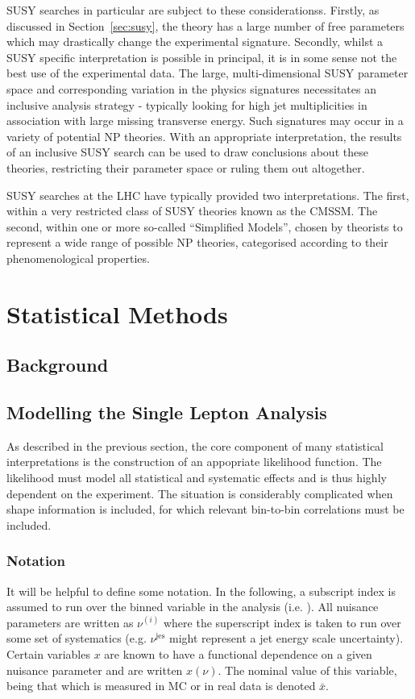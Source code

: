 \ac{SUSY} searches in particular are subject to these
considerationss. Firstly, as discussed in Section~\ref{sec:susy}, the theory
has a large number of free parameters which may drastically change the
experimental signature. Secondly, whilst a \ac{SUSY} specific interpretation is
possible in principal, it is in some sense not the best use of the experimental
data. The large, multi-dimensional \ac{SUSY} parameter space and corresponding
variation in the physics signatures necessitates an inclusive analysis
strategy - typically looking for high jet multiplicities in association with
large missing transverse energy. Such signatures may occur in a variety of
potential \ac{NP} theories. With an appropriate interpretation, the results of
an inclusive \ac{SUSY} search can be used to draw conclusions about these
theories, restricting their parameter space or ruling them out altogether.

\ac{SUSY} searches at the \ac{LHC} have typically provided two
interpretations. The first, within a very restricted class of \ac{SUSY} theories
known as the \ac{CMSSM}. The second, within one or more so-called ``Simplified
Models'', chosen by theorists to represent a wide range of possible \ac{NP}
theories, categorised according to their phenomenological properties.

\section{Statistical Methods}
\subsection{Background}

\subsection{Modelling the Single Lepton Analysis}
As described in the previous section, the core component of many statistical
interpretations is the construction of an appopriate likelihood function. The
likelihood must model all statistical and systematic effects and is thus highly
dependent on the experiment. The situation is considerably complicated when
shape information is included, for which relevant bin-to-bin correlations must
be included.

\subsubsection{Notation}
It will be helpful to define some notation. In the following, a subscript index
is assumed to run over the binned variable in the analysis
(i.e. \STlep). All nuisance parameters are written as $\nu^{(i)}$ where the
superscript index is taken to run over some set of systematics
(e.g. $\nu^{\textrm{jes}}$ might represent a jet energy scale
uncertainty). Certain variables $x$ are known to have a functional dependence on a
given nuisance parameter and are written $x(\nu)$. The nominal value of this
variable, being that which is measured in \ac{MC} or in real data is denoted
$\bar{x}$.

